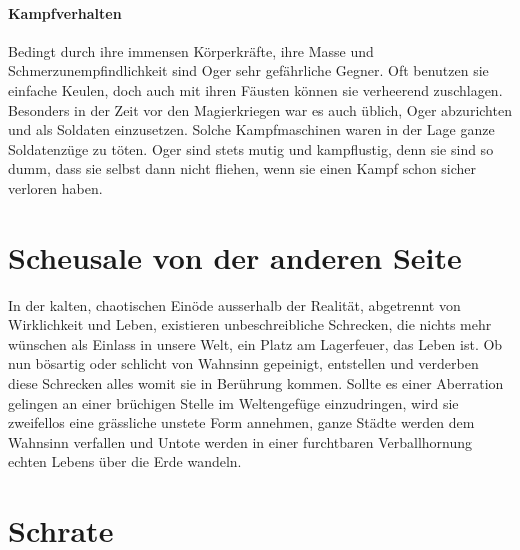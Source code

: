 \documentclass[10pt,twoside,twocolumn,openany]{book}
\begin{document}
\begin{multicols}{2}
	\paragraph{Kampfverhalten}
	Bedingt durch ihre immensen Körperkräfte, ihre Masse und Schmerzunempfindlichkeit sind Oger sehr gefährliche Gegner. Oft benutzen sie einfache Keulen, doch auch mit ihren Fäusten können sie verheerend zuschlagen. Besonders in der Zeit vor den Magierkriegen war es auch üblich, Oger abzurichten und als Soldaten einzusetzen. Solche Kampfmaschinen waren in der Lage ganze  Soldatenzüge zu töten. Oger sind stets mutig und kampflustig, denn sie sind so dumm, dass sie selbst dann nicht fliehen, wenn sie einen Kampf schon sicher verloren haben.
	
\end{multicols}

\newpage
\section{Scheusale von der anderen Seite}
\begin{multicols}{2}


	In der kalten, chaotischen Einöde ausserhalb der Realität, abgetrennt von Wirklichkeit und Leben, existieren unbeschreibliche Schrecken, die nichts mehr wünschen als Einlass in unsere Welt, ein Platz am Lagerfeuer, das Leben ist. Ob nun bösartig oder schlicht von Wahnsinn gepeinigt, entstellen und verderben diese Schrecken alles womit sie in Berührung kommen. Sollte es einer Aberration gelingen an einer brüchigen Stelle im Weltengefüge einzudringen, wird sie zweifellos eine grässliche unstete Form annehmen, ganze Städte werden dem Wahnsinn verfallen und Untote werden in einer furchtbaren Verballhornung echten Lebens über die Erde wandeln.
\end{multicols}

\section{Schrate}
\end{document}
